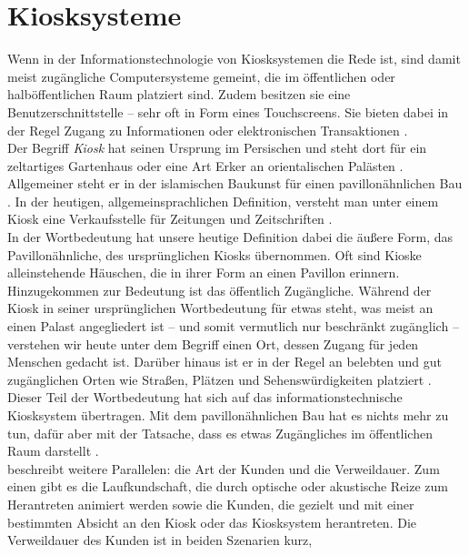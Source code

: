 \section{Kiosksysteme}
\label{sec:kiosk}

Wenn in der Informationstechnologie von Kiosksystemen die Rede ist, sind damit
meist zugängliche Computersysteme gemeint, die im öffentlichen oder halböffentlichen 
Raum platziert sind. Zudem besitzen sie eine Benutzerschnittstelle -- sehr oft in Form
eines Touchscreens. Sie bieten dabei in der Regel Zugang zu Informationen 
oder elektronischen Transaktionen \cite{retailing}.\\

Der Begriff \emph{Kiosk} hat seinen Ursprung im Persischen und steht dort für
ein zeltartiges Gartenhaus oder eine Art Erker an orientalischen Palästen \cite{meyers}.
Allgemeiner steht er in der islamischen Baukunst für einen pavillonähnlichen Bau \cite{taschenlexikon}.
In der heutigen, allgemeinsprachlichen Definition, versteht man unter einem Kiosk eine Verkaufsstelle
für Zeitungen und Zeitschriften \cite{taschenlexikon, meyers}.\\
In der Wortbedeutung hat unsere heutige Definition dabei die äußere Form, das Pavillonähnliche, 
des ursprünglichen Kiosks übernommen. Oft sind Kioske alleinstehende Häuschen, die in ihrer Form
an einen Pavillon erinnern. Hinzugekommen zur Bedeutung ist das öffentlich Zugängliche. Während der Kiosk 
in seiner ursprünglichen Wortbedeutung für etwas steht, was meist an einen Palast angegliedert ist -- und 
somit vermutlich nur beschränkt zugänglich -- verstehen wir heute unter dem Begriff einen Ort, dessen Zugang
für jeden Menschen gedacht ist. Darüber hinaus ist er in der Regel an belebten und gut zugänglichen Orten 
wie Straßen, Plätzen und Sehenswürdigkeiten platziert \cite{multimediale}.\\
Dieser Teil der Wortbedeutung hat sich auf das informationstechnische Kiosksystem übertragen. Mit dem 
pavillonähnlichen Bau hat es nichts mehr zu tun, dafür aber mit der Tatsache, dass es etwas Zugängliches 
im öffentlichen Raum darstellt \cite{multimediale}.\\
 beschreibt weitere Parallelen: die Art der Kunden und 
die Verweildauer. Zum einen gibt es die Laufkundschaft, die durch optische oder akustische Reize
zum Herantreten animiert werden sowie die Kunden, die gezielt und mit einer bestimmten Absicht an den Kiosk
oder das Kiosksystem herantreten. Die Verweildauer des Kunden ist in beiden Szenarien kurz, 
